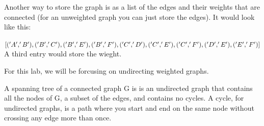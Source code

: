 Another way to store the graph is as a list of the edges and their weights that are connected (for an unweighted graph you can just store the edges).
It would look like this:

$[('A', 'B'),
 ('B', 'C'),
 ('B', 'E'),
 ('B', 'F'),
 ('C', 'D'),\\
 ('C', 'E'),
 ('C', 'F'),
 ('D', 'E'),
 ('E', 'F')]$\\
A third entry would store the wieght.

For this lab, we will be forcusing on undirecting weighted graphs. 

A spanning tree of a connected graph G is is an undirected graph that contains all the nodes of G, a subset of the edges, and contains no cycles.
A cycle, for undirected graphs, is a path where you start and end on the same node without crossing any edge more than once.

